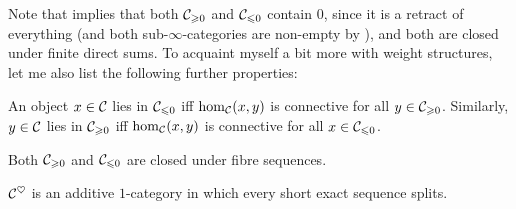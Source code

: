 \documentclass[a4paper, 10pt, oneside, DIV=9, chapterprefix=true, numbers=enddot,bibliography=totoc]{scrbook}
\begin{document}
Note that  implies that both $\mathcal{C}_{\geqslant 0}$ and $\mathcal{C}_{\leqslant 0}$ contain $0$, since it is a retract of everything (and both sub-$\infty$-categories are non-empty by ), and both are closed under finite direct sums. To acquaint myself a bit more with weight structures, let me also list the following further properties:
\begin{lem*}
	\begin{alphanumerate}
		\item An object $x\in \mathcal{C}$ lies in $\mathcal{C}_{\leqslant 0}$ iff $\hom_{\mathcal{C}}(x,y)$ is connective for all $y\in \mathcal{C}_{\geqslant 0}$. Similarly, $y\in \mathcal{C}$ lies in $\mathcal{C}_{\geqslant 0}$ iff $\hom_{\mathcal{C}}(x,y)$ is connective for all $x\in \mathcal{C}_{\leqslant 0}$.
		\item Both $\mathcal{C}_{\geqslant 0}$ and $\mathcal{C}_{\leqslant 0}$ are closed under fibre sequences.
		\item $\mathcal{C}^\heartsuit$ is an additive $1$-category in which every short exact sequence splits.
	\end{alphanumerate}
\end{lem*}
\end{document}
